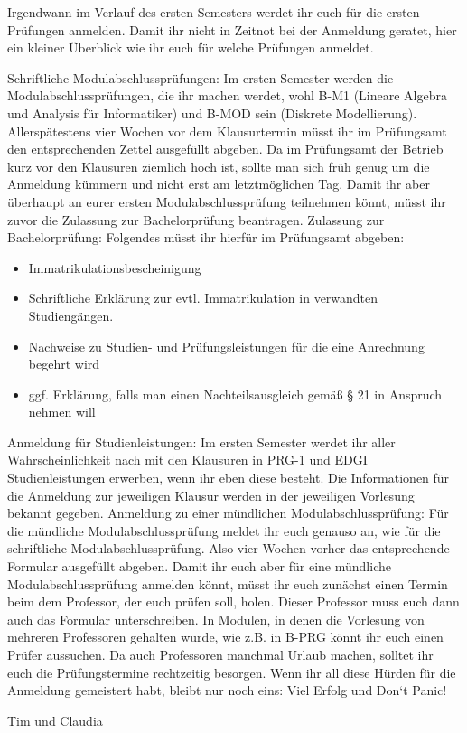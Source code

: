 Irgendwann im Verlauf des ersten Semesters werdet ihr euch für die ersten Prüfungen anmelden. Damit ihr nicht in Zeitnot bei der Anmeldung geratet, hier ein kleiner Überblick wie ihr euch für welche Prüfungen anmeldet.

Schriftliche Modulabschlussprüfungen: Im ersten Semester werden die Modulabschlussprüfungen, die ihr machen werdet, wohl B-M1 (Lineare Algebra und Analysis für Informatiker) und B-MOD sein (Diskrete Modellierung). Allerspätestens vier Wochen vor dem Klausurtermin müsst ihr im Prüfungsamt den entsprechenden Zettel ausgefüllt abgeben. Da im Prüfungsamt der Betrieb kurz vor den Klausuren ziemlich hoch ist, sollte man sich früh genug um die Anmeldung kümmern und nicht erst am letztmöglichen Tag. Damit ihr aber überhaupt an eurer ersten Modulabschlussprüfung teilnehmen könnt, müsst ihr zuvor die Zulassung zur Bachelorprüfung beantragen. Zulassung zur Bachelorprüfung: Folgendes müsst ihr hierfür im Prüfungsamt abgeben:
\begin{itemize}
\item Immatrikulationsbescheinigung
\item Schriftliche Erklärung zur evtl. Immatrikulation in verwandten Studiengängen.
\item Nachweise zu Studien- und Prüfungsleistungen für die eine Anrechnung begehrt wird
\item ggf. Erklärung, falls man einen Nachteilsausgleich gemäß § 21 in Anspruch nehmen will
\end{itemize}
Anmeldung für Studienleistungen: Im ersten Semester werdet ihr aller Wahrscheinlichkeit nach mit den Klausuren in PRG-1 und EDGI Studienleistungen erwerben, wenn ihr eben diese besteht. Die Informationen für die Anmeldung zur jeweiligen Klausur werden in der jeweiligen Vorlesung bekannt gegeben. Anmeldung zu einer mündlichen Modulabschlussprüfung: Für die mündliche Modulabschlussprüfung meldet ihr euch genauso an, wie für die schriftliche Modulabschlussprüfung. Also vier Wochen vorher das entsprechende Formular ausgefüllt abgeben. Damit ihr euch aber für eine mündliche Modulabschlussprüfung anmelden könnt, müsst ihr euch zunächst einen Termin beim dem Professor, der euch prüfen soll, holen. Dieser Professor muss euch dann auch das Formular unterschreiben. In Modulen, in denen die Vorlesung von mehreren Professoren gehalten wurde, wie z.B. in B-PRG könnt ihr euch einen Prüfer aussuchen. Da auch Professoren manchmal Urlaub machen, solltet ihr euch die Prüfungstermine rechtzeitig besorgen. Wenn ihr all diese Hürden für die Anmeldung gemeistert habt, bleibt nur noch eins: Viel Erfolg und Don‘t Panic!

\begin{flushright}Tim und Claudia\end{flushright}
